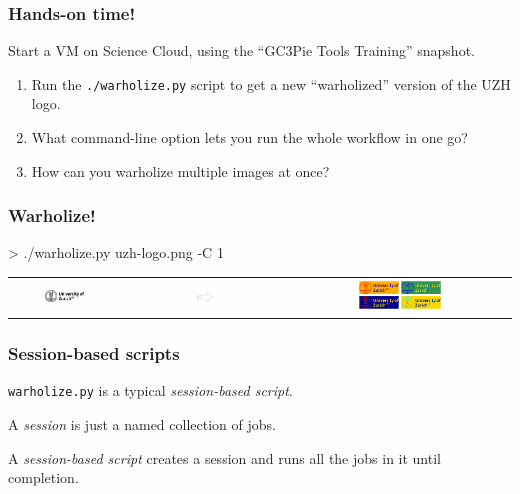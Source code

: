 \documentclass[english,serif,mathserif,usenames,dvipsnames]{beamer}
\begin{document}
\begin{frame}
  \frametitle{Hands-on time!}

  Start a VM on Science Cloud, using the ``GC3Pie Tools Training'' snapshot.

  \+
  \begin{exercise}

    \begin{enumerate}
    \item Run the \texttt{./warholize.py} script to get a new
      ``warholized'' version of the UZH logo.

    \item What command-line option lets you run the whole workflow
      in one go?

    \item How can you warholize \textrm{multiple} images at once?
    \end{enumerate}
  \end{exercise}
\end{frame}


\begin{frame}
  \frametitle{Warholize!}

\begin{semiverbatim}
    > ./warholize.py uzh-logo.png -C 1
\end{semiverbatim}

  \begin{tabular}[c]{ccc}
    \includegraphics[width=0.4\textwidth]{fig/uzh-logo.png}
    &
    \includegraphics[width=0.1\textwidth]{fig/arrow.pdf}
    &
    \includegraphics[width=0.4\textwidth]{fig/warholized-uzh-logo.png}
  \end{tabular}
\end{frame}


\begin{frame}
  \frametitle{Session-based scripts}

  \texttt{warholize.py} is a typical \emph{session-based script}.

  \+ A \emph{session} is just a named collection of jobs.

  \+ A \emph{session-based script} creates a session and runs all the
  jobs in it until completion.
\end{frame}
\end{document}
